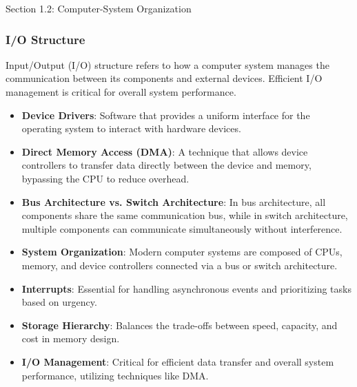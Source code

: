\begin{notes}{Section 1.2: Computer-System Organization}
\begin{highlight}
    \end{highlight}
    
    \subsubsection*{I/O Structure}
    
    Input/Output (I/O) structure refers to how a computer system manages the communication between its components and external devices. Efficient I/O management is critical for overall system performance.
    
    \begin{highlight}[I/O Structure]
    
    \begin{itemize}
        \item \textbf{Device Drivers}: Software that provides a uniform interface for the operating system to interact with hardware devices.
        \item \textbf{Direct Memory Access (DMA)}: A technique that allows device controllers to transfer data directly between the device and memory, bypassing the CPU to reduce overhead.
        \item \textbf{Bus Architecture vs. Switch Architecture}: In bus architecture, all components share the same communication bus, while in switch architecture, multiple components can communicate 
        simultaneously without interference.
    \end{itemize}
    
    \end{highlight}
    
    \begin{highlight}
    
    \begin{itemize}
        \item \textbf{System Organization}: Modern computer systems are composed of CPUs, memory, and device controllers connected via a bus or switch architecture.
        \item \textbf{Interrupts}: Essential for handling asynchronous events and prioritizing tasks based on urgency.
        \item \textbf{Storage Hierarchy}: Balances the trade-offs between speed, capacity, and cost in memory design.
        \item \textbf{I/O Management}: Critical for efficient data transfer and overall system performance, utilizing techniques like DMA.
    \end{itemize}
    
    \end{highlight}
\end{notes}

